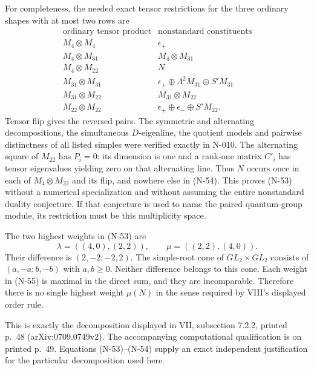 For completeness, the needed exact tensor restrictions for the
three ordinary shapes with at most two rows are
\[
\begin{array}{c|c}
\text{ordinary tensor product}&\text{nonstandard constituents}\\\hline
M_4\otimes M_4&\epsilon_+\\
M_4\otimes M_{31}&M_4\otimes M_{31}\\
M_4\otimes M_{22}&N\\
M_{31}\otimes M_{31}&\epsilon_+\oplus\Lambda^2M_{31}\oplus S'M_{31}\\
M_{31}\otimes M_{22}&M_{31}\otimes M_{22}\\
M_{22}\otimes M_{22}&\epsilon_+\oplus\epsilon_-\oplus S'M_{22}.
\end{array}
 \tag{N-54}
\]
Tensor flip gives the reversed pairs.  The symmetric and
alternating decompositions, the simultaneous $D$-eigenline,
the quotient models and pairwise distinctness of all listed
simples were verified exactly in N-010.  The alternating
square of $M_{22}$ has $P_i=0$: its dimension is one and a
rank-one matrix $C'_i$ has tensor eigenvalues yielding zero
on that alternating line.  Thus $N$ occurs once in each of
$M_4\otimes M_{22}$ and its flip, and nowhere else in (N-54).
This proves (N-53) without a numerical specialization and
without assuming the entire nonstandard duality conjecture.
If that conjecture is used to name the paired quantum-group
module, its restriction must be this multiplicity space.

The two highest weights in (N-53) are
\[
 \lambda=((4,0),(2,2)),\qquad
 \mu=((2,2),(4,0)).
 \tag{N-55}
\]
Their difference is $(2,-2;-2,2)$.  The simple-root cone of
$GL_2\times GL_2$ consists of
$(a,-a;b,-b)$ with $a,b\ge0$.  Neither difference belongs
to this cone.  Each weight in (N-55) is maximal in the
direct sum, and they are incomparable.  Therefore there is
no single highest weight $\mu(N)$ in the sense required
by VIII's displayed order rule.

This is exactly the decomposition displayed in VII,
subsection 7.2.2, printed p.~48 (arXiv:0709.0749v2).
The accompanying computational qualification is on printed
p.~49.  Equations (N-53)--(N-54) supply an exact independent
justification for the particular decomposition used here.

